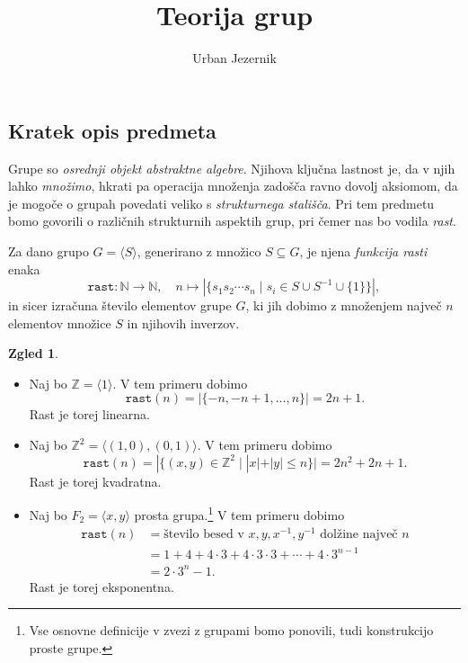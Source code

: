 \documentclass[11pt]{book}
\title{\bf Teorija grup}
\author{Urban Jezernik}
\def\NN{\mathbb{N}}
\def\ZZ{\mathbb{Z}}
\def\vprasanje{\color{oranzna}}
\theoremstyle{definition}
\theoremstyle{zgled}
\newtheorem*{zgled}{Zgled}
\theoremstyle{odprtproblem}
\theoremstyle{domacanaloga}
\theoremstyle{izrek}
\begin{document}
\baselineskip=14pt

\maketitle

\setcounter{tocdepth}{1}
\tableofcontents

\newpage

\subsection*{Kratek opis predmeta}

Grupe so {\em osrednji objekt abstraktne algebre}. Njihova ključna lastnost je, da v njih lahko {\em množimo}, hkrati pa operacija množenja zadošča ravno dovolj aksiomom, da je mogoče o grupah povedati veliko s {\em strukturnega stališča}. Pri tem predmetu bomo govorili o različnih strukturnih aspektih grup, pri čemer nas bo vodila {\em rast}.

Za dano grupo $G = \langle S \rangle$, generirano z množico $S \subseteq G$, je njena {\em funkcija rasti} enaka
\[
\texttt{rast} \colon \NN \to \NN, \quad n \mapsto |\{ s_1 s_2 \cdots s_n \mid s_i \in S \cup S^{-1} \cup \{ 1 \} \}|,
\]
in sicer izračuna število elementov grupe $G$, ki jih dobimo z množenjem največ $n$ elementov množice $S$ in njihovih inverzov.

\begin{zgled}
\begin{itemize}
\item Naj bo $\ZZ = \langle 1 \rangle$. V tem primeru dobimo
\[
\texttt{rast}(n) = |\{ -n, -n+1, \dots, n \}| = 2n+1.
\]
Rast je torej {\vprasanje linearna}.

\item Naj bo $\ZZ^2 = \langle (1,0), (0,1) \rangle$. V tem primeru dobimo
\[
\texttt{rast}(n) = |\{ (x,y) \in \ZZ^2 \mid |x| + |y| \leq n \}| = 2 n^2 + 2 n + 1.
\]
Rast je torej {\vprasanje kvadratna}.

\item Naj bo $F_2 = \langle x,y \rangle$ prosta grupa.\footnote{Vse osnovne definicije v zvezi z grupami bomo ponovili, tudi konstrukcijo proste grupe.} V tem primeru dobimo
\begin{align*}
\texttt{rast}(n) &= \text{število besed v $x,y,x^{-1},y^{-1}$ dolžine največ $n$} \\ 
&= 1 + 4 + 4 \cdot 3 + 4 \cdot 3 \cdot 3 + \cdots + 4 \cdot 3^{n-1} \\
&= 2 \cdot 3^n - 1.
\end{align*}
Rast je torej {\vprasanje eksponentna}.

\end{itemize}
\end{zgled}
\end{document}
